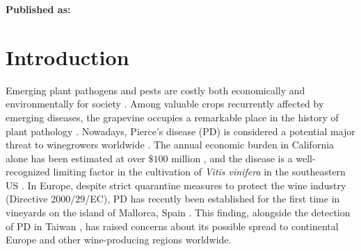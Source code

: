 




\textbf{Published as:}

\vspace{0.5cm}


\newpage
\section{Introduction}
Emerging plant pathogens and pests are costly both economically and
environmentally for society
\cite{Carvajal2019,Mooney2001,Pimentel2000,Spence2020}. Among valuable crops
recurrently affected by emerging diseases, the grapevine occupies a remarkable
place in the history of plant pathology \cite{Borkarbook, Brewer2010,
    Rouxel2014, Tello2019}. Nowadays, Pierce's disease (PD) is considered a
potential major threat to winegrowers worldwide \cite{Hopkins2002}. The annual
economic burden in California alone has been estimated at over $\$ 100$ million
\cite{Tumber2014}, and the disease is a well-recognized limiting factor in the
cultivation of \textit{Vitis vinifera} in the southeastern US
\cite{Hopkins2002}. In Europe, despite strict quarantine measures to protect
the wine industry (Directive 2000/29/EC), PD has recently been established for
the first time in vineyards on the island of Mallorca, Spain \cite{Gomila2019,
    Moralejo2019}. This finding, alongside the detection of PD in Taiwan
\cite{Su2013}, has raised concerns about its possible spread to continental
Europe and other wine-producing regions worldwide.

